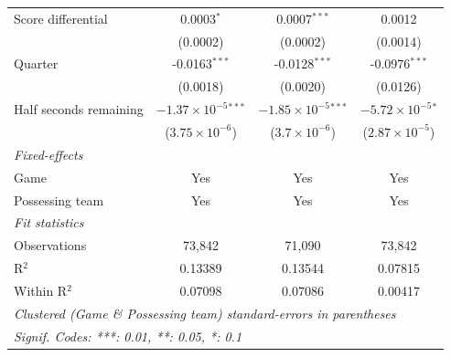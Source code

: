 \begin{table}[htbp]
\begin{tabular}{lccc}
      Score differential                      & 0.0003$^{*}$                   & 0.0007$^{***}$                 & 0.0012\\   
                                              & (0.0002)                       & (0.0002)                       & (0.0014)\\   
      Quarter                                 & -0.0163$^{***}$                & -0.0128$^{***}$                & -0.0976$^{***}$\\   
                                              & (0.0018)                       & (0.0020)                       & (0.0126)\\   
      Half seconds remaining                  & $-1.37\times 10^{-5}$$^{***}$  & $-1.85\times 10^{-5}$$^{***}$  & $-5.72\times 10^{-5}$$^{*}$\\    
                                              & ($3.75\times 10^{-6}$)         & ($3.7\times 10^{-6}$)          & ($2.87\times 10^{-5}$)\\    
      \midrule
      \emph{Fixed-effects}\\
      Game                                    & Yes                            & Yes                            & Yes\\  
      Possessing team                         & Yes                            & Yes                            & Yes\\  
      \midrule
      \emph{Fit statistics}\\
      Observations                            & 73,842                         & 71,090                         & 73,842\\  
      R$^2$                                   & 0.13389                        & 0.13544                        & 0.07815\\  
      Within R$^2$                            & 0.07098                        & 0.07086                        & 0.00417\\  
      \midrule \midrule
      \multicolumn{4}{l}{\emph{Clustered (Game \& Possessing team) standard-errors in parentheses}}\\
      \multicolumn{4}{l}{\emph{Signif. Codes: ***: 0.01, **: 0.05, *: 0.1}}\\
   \end{tabular}
\end{table}


